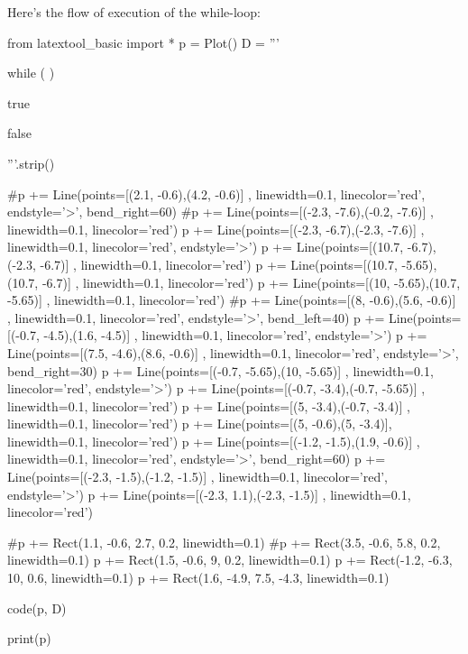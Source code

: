 Here's the flow of execution of the while-loop:

\begin{python}
from latextool_basic import *
p = Plot()
D = '''





while (                                        )








true
         
               
false





'''.strip()

#p += Line(points=[(2.1, -0.6),(4.2, -0.6)] , linewidth=0.1, linecolor='red', endstyle='>', bend_right=60)
#p += Line(points=[(-2.3, -7.6),(-0.2, -7.6)] , linewidth=0.1, linecolor='red')
p += Line(points=[(-2.3, -6.7),(-2.3, -7.6)] , linewidth=0.1, linecolor='red', endstyle='>')
p += Line(points=[(10.7, -6.7),(-2.3, -6.7)] , linewidth=0.1, linecolor='red')
p += Line(points=[(10.7, -5.65), (10.7, -6.7)] , linewidth=0.1, linecolor='red')
p += Line(points=[(10, -5.65),(10.7, -5.65)] , linewidth=0.1, linecolor='red')
#p += Line(points=[(8, -0.6),(5.6, -0.6)] , linewidth=0.1, linecolor='red', endstyle='>', bend_left=40)
p += Line(points=[(-0.7, -4.5),(1.6, -4.5)] , linewidth=0.1, linecolor='red', endstyle='>')
p += Line(points=[(7.5, -4.6),(8.6, -0.6)] , linewidth=0.1, linecolor='red', endstyle='>', bend_right=30)
p += Line(points=[(-0.7, -5.65),(10, -5.65)] , linewidth=0.1, linecolor='red', endstyle='>')
p += Line(points=[(-0.7, -3.4),(-0.7, -5.65)] , linewidth=0.1, linecolor='red')
p += Line(points=[(5, -3.4),(-0.7, -3.4)] , linewidth=0.1, linecolor='red')
p += Line(points=[(5, -0.6),(5, -3.4)], linewidth=0.1, linecolor='red')
p += Line(points=[(-1.2, -1.5),(1.9, -0.6)] , linewidth=0.1, linecolor='red', endstyle='>', bend_right=60)
p += Line(points=[(-2.3, -1.5),(-1.2, -1.5)] , linewidth=0.1, linecolor='red', endstyle='>')
p += Line(points=[(-2.3, 1.1),(-2.3, -1.5)] , linewidth=0.1, linecolor='red')

#p += Rect(1.1, -0.6, 2.7, 0.2, linewidth=0.1)
#p += Rect(3.5, -0.6, 5.8, 0.2, linewidth=0.1)
p += Rect(1.5, -0.6, 9, 0.2, linewidth=0.1)
p += Rect(-1.2, -6.3, 10, 0.6, linewidth=0.1)
p += Rect(1.6, -4.9, 7.5, -4.3, linewidth=0.1)

code(p, D)

print(p)
\end{python}

